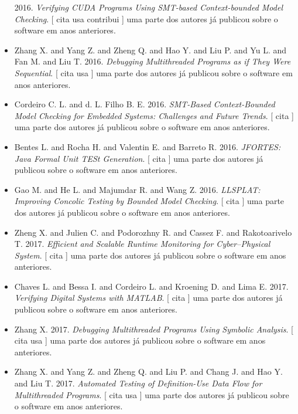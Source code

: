 \begin{itemize}
      2016.
        \textit{ Verifying CUDA Programs Using SMT-based Context-bounded Model Checking}.
      [
          cita
          usa
          contribui
      ]
uma parte dos autores já publicou sobre o software em anos anteriores.
\item Zhang X. and Yang Z. and Zheng Q. and Hao Y. and Liu P. and Yu L. and Fan M. and Liu T.
      2016.
        \textit{ Debugging Multithreaded Programs as if They Were Sequential}.
      [
          cita
          usa
      ]
uma parte dos autores já publicou sobre o software em anos anteriores.
\item Cordeiro C. L. and d. L. Filho B. E.
      2016.
        \textit{ SMT-Based Context-Bounded Model Checking for Embedded Systems: Challenges and Future Trends}.
      [
          cita
      ]
uma parte dos autores já publicou sobre o software em anos anteriores.
\item Bentes L. and Rocha H. and Valentin E. and Barreto R.
      2016.
        \textit{ JFORTES: Java Formal Unit TESt Generation}.
      [
          cita
      ]
uma parte dos autores já publicou sobre o software em anos anteriores.
\item Gao M. and He L. and Majumdar R. and Wang Z.
      2016.
        \textit{ LLSPLAT: Improving Concolic Testing by Bounded Model Checking}.
      [
          cita
      ]
uma parte dos autores já publicou sobre o software em anos anteriores.
\item Zheng X. and Julien C. and Podorozhny R. and Cassez F. and Rakotoarivelo T.
      2017.
        \textit{ Efficient and Scalable Runtime Monitoring for Cyber--Physical System}.
      [
          cita
      ]
uma parte dos autores já publicou sobre o software em anos anteriores.
\item Chaves L. and Bessa I. and Cordeiro L. and Kroening D. and Lima E.
      2017.
        \textit{ Verifying Digital Systems with MATLAB}.
      [
          cita
      ]
uma parte dos autores já publicou sobre o software em anos anteriores.
\item Zhang X.
      2017.
        \textit{ Debugging Multithreaded Programs Using Symbolic Analysis}.
      [
          cita
          usa
      ]
uma parte dos autores já publicou sobre o software em anos anteriores.
\item Zhang X. and Yang Z. and Zheng Q. and Liu P. and Chang J. and Hao Y. and Liu T.
      2017.
        \textit{ Automated Testing of Definition-Use Data Flow for Multithreaded Programs}.
      [
          cita
          usa
      ]
uma parte dos autores já publicou sobre o software em anos anteriores.
\end{itemize}
